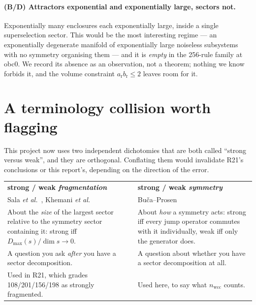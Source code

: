 \documentclass[11pt]{article}
\theoremstyle{plain}
\theoremstyle{definition}
\theoremstyle{remark}
\begin{document}
\paragraph{(B/D) Attractors exponential and exponentially large, sectors not.}
Exponentially many enclosures each exponentially large, inside a single
superselection sector. This would be the most interesting regime --- an
exponentially degenerate manifold of exponentially large noiseless
subsystems with no symmetry organising them --- and it is \emph{empty} in the
256-rule family at obc0. We record its absence as an observation, not a
theorem; nothing we know forbids it, and the volume constraint
$a_{\mathrm{r}} b_{\mathrm{r}} \le 2$ leaves room for it.

\section{A terminology collision worth flagging}
\label{sec:collision}

This project now uses two independent dichotomies that are both called
``strong versus weak'', and they are orthogonal. Conflating them would
invalidate R21's conclusions or this report's, depending on the direction of
the error.

\begin{center}
\small
\begin{tabular}{@{}p{}p{}@{}}
\toprule
\textbf{strong / weak \emph{fragmentation}} &
\textbf{strong / weak \emph{symmetry}} \\
Sala \emph{et al.}~\cite{sala2020}, Khemani \emph{et al.}~\cite{khemani2020} &
Bu\v{c}a--Prosen~\cite{buca2012} \\
\midrule
About the \emph{size} of the largest sector relative to the symmetry sector
containing it: strong iff $D_{\max}(s)/\dim s \to 0$. &
About \emph{how} a symmetry acts: strong iff every jump operator commutes with
it individually, weak iff only the generator does. \\[4pt]
A question you ask \emph{after} you have a sector decomposition. &
A question about whether you have a sector decomposition at all. \\[4pt]
Used in R21, which grades 108/201/156/198 as strongly fragmented. &
Used here, to say what $n_{\mathrm{wcc}}$ counts. \\
\bottomrule
\end{tabular}
\end{center}
\end{document}
